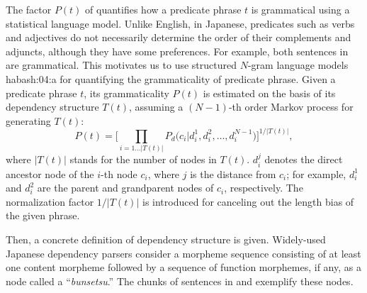 \documentclass[english]{jnlp_1.4}
\renewcommand{\cite}{}
\begin{document}
The factor $P(t)$ of  quantifies how a predicate phrase
$t$ is grammatical using a statistical language model.
Unlike English, in Japanese, predicates such as verbs and adjectives
do not necessarily determine the order of their complements and
adjuncts, although they have some preferences.  For example, both
sentences in  are grammatical.
This motivates us to use structured $N$-gram language models
\cite{habash:04:a} for quantifying the grammaticality of predicate
phrase.
Given a predicate phrase $t$, its grammaticality $P(t)$ is estimated
on the basis of its dependency structure $T(t)$, assuming a
$(N-\text{1})$-th order Markov process for generating $T(t)$:
\[
  P(t) = \Biggl[\prod_{i=1\ldots |T(t)|}
	  P_{d}\bigl(c_{i}|d_{i}^{1},d_{i}^{2},\ldots,d_{i}^{N-1}\bigr)
  \Biggr]^{1/|T(t)|},
\]
where $|T(t)|$ stands for the number of nodes in $T(t)$.  $d_{i}^{j}$
denotes the direct ancestor node of the $i$-th node $c_{i}$, where $j$
is the distance from $c_{i}$; for example, $d_{i}^{1}$ and $d_{i}^{2}$
are the parent and grandparent nodes of $c_{i}$, respectively.
The normalization factor $1/|T(t)|$ is introduced for canceling out
the length bias of the given phrase.

Then, a concrete definition of dependency structure is given.
Widely-used Japanese dependency parsers consider a morpheme sequence
consisting of at least one content morpheme followed by a sequence of
function morphemes, if any, as a node called a ``\textit{bunsetsu}.''
\pagebreak
The chunks of \mbox{sentences} in  and  exemplify
these nodes.
\end{document}
